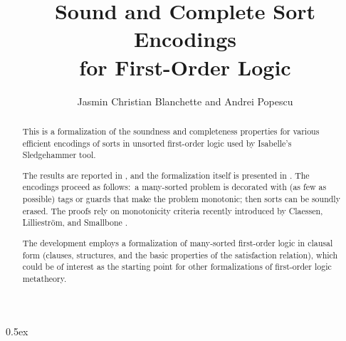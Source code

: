 \documentclass[11pt,a4paper]{article}
\begin{document}
\title{Sound and Complete Sort Encodings \\for First-Order Logic}
\author{Jasmin Christian Blanchette and Andrei Popescu}
\date{}
\maketitle

\begin{abstract}
This is a formalization of the soundness and completeness properties for
various efficient encodings of sorts in unsorted first-order logic
used by Isabelle's Sledgehammer tool.

The results are reported in
\cite[\S2,3]{blanchette-et-al-2013-types-conf}, and the formalization itself
is presented in \cite[\S3--5]{froc}.
%
The encodings proceed as follows:\ a many-sorted problem is decorated with (as
few as possible) tags or guards that make the problem monotonic; then sorts can
be soundly erased.
%
The proofs rely on monotonicity criteria recently introduced by
Claessen, Lilliestr{\"o}m, and Smallbone \cite{claessen-et-al-2011}.

The development employs a formalization of many-sorted first-order logic in
clausal form (clauses, structures, and the basic properties of the satisfaction
relation), which could be of interest as the starting point for other
formalizations of first-order logic metatheory.

\end{abstract}




\newpage
\tableofcontents


\parindent 0pt\parskip 0.5ex





\end{document}
